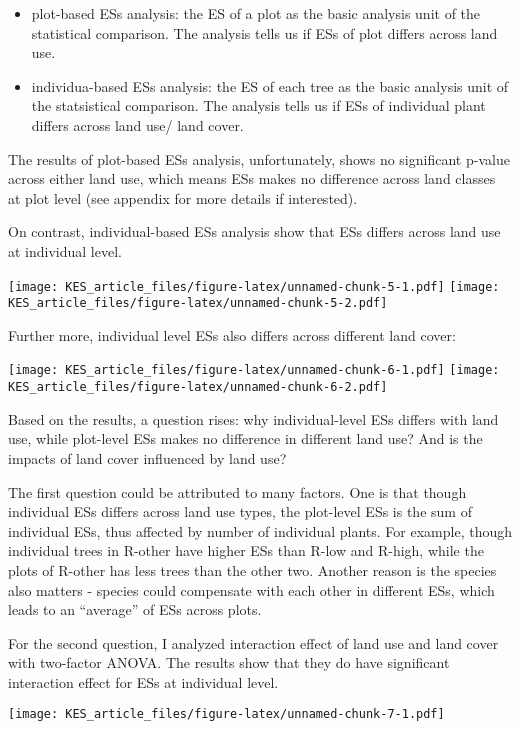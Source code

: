 \documentclass[
]{article}
\begin{document}
\begin{itemize}
\item
  plot-based ESs analysis: the ES of a plot as the basic analysis unit of the statistical comparison. The analysis tells us if ESs of plot differs across land use.
\item
  individua-based ESs analysis: the ES of each tree as the basic analysis unit of the statsistical comparison. The analysis tells us if ESs of individual plant differs across land use/ land cover.
\end{itemize}

The results of plot-based ESs analysis, unfortunately, shows no significant p-value across either land use, which means ESs makes no difference across land classes at plot level (see appendix for more details if interested).

On contrast, individual-based ESs analysis show that ESs differs across land use at individual level.

\texttt{[image: KES\_article\_files/figure-latex/unnamed-chunk-5-1.pdf]} \texttt{[image: KES\_article\_files/figure-latex/unnamed-chunk-5-2.pdf]}

Further more, individual level ESs also differs across different land cover:

\texttt{[image: KES\_article\_files/figure-latex/unnamed-chunk-6-1.pdf]} \texttt{[image: KES\_article\_files/figure-latex/unnamed-chunk-6-2.pdf]}

Based on the results, a question rises: why individual-level ESs differs with land use, while plot-level ESs makes no difference in different land use? And is the impacts of land cover influenced by land use?

The first question could be attributed to many factors. One is that though individual ESs differs across land use types, the plot-level ESs is the sum of individual ESs, thus affected by number of individual plants. For example, though individual trees in R-other have higher ESs than R-low and R-high, while the plots of R-other has less trees than the other two. Another reason is the species also matters - species could compensate with each other in different ESs, which leads to an ``average'' of ESs across plots.

For the second question, I analyzed interaction effect of land use and land cover with two-factor ANOVA. The results show that they do have significant interaction effect for ESs at individual level.

\texttt{[image: KES\_article\_files/figure-latex/unnamed-chunk-7-1.pdf]}
\end{document}
